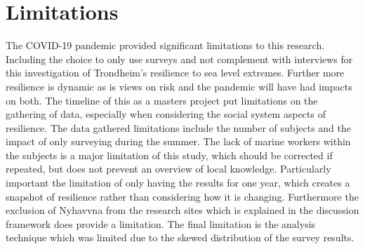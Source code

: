 \section{Limitations}
The COVID-19 pandemic provided significant limitations to this research. Including the choice to only use surveys and not complement with interviews for this investigation of Trondheim's resilience to sea level extremes. Further more resilience is dynamic as is views on risk and the pandemic will have had impacts on both. The timeline of this as a masters project put limitations on the gathering of data, especially when considering the social system aspects of resilience. The data gathered limitations include the number of subjects and the impact of only surveying during the summer. The lack of marine workers within the subjects is a major limitation of this study, which should be corrected if repeated, but does not prevent an overview of local knowledge. Particularly important the limitation of only having the results for one year, which creates a snapshot of resilience rather than considering how it is changing. Furthermore the exclusion of Nyhavvna from the research sites which is explained in the discussion framework does provide a limitation.  The final limitation is the analysis technique which was limited due to the skewed distribution of the survey results.

